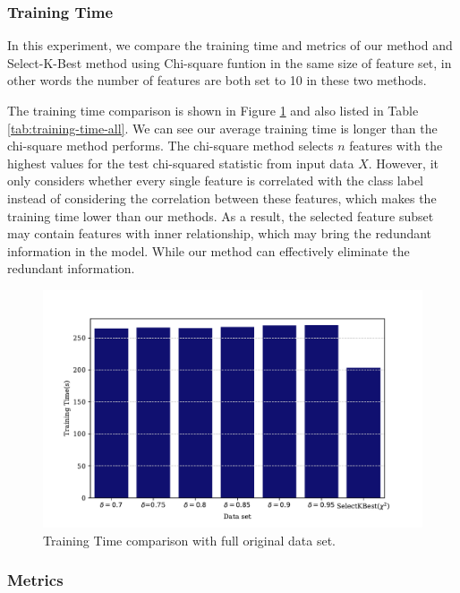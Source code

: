 \documentclass{ieeeaccess}
\theoremstyle{definition}
\begin{document}
\subsubsection{Training Time}

In this experiment, we compare the training time and metrics of our method and Select-K-Best method using Chi-square funtion in the same size of feature set, in other words the number of features are both set to 10 in these two methods.

The training time comparison is shown in Figure \ref{fig:training-time-with-chi2} and also listed in Table \ref{tab:training-time-all}. We can see our average training time is longer than the chi-square method performs. The chi-square method selects $n$ features with the highest values for the test chi-squared statistic from input data $X$. However, it only considers whether every single feature is correlated with the class label instead of considering the correlation between these features, which makes the training time lower than our methods.
As a result, the selected feature subset may contain features with inner relationship, which may bring the redundant information in the model. While our method can effectively eliminate the redundant information.

\begin{figure}[!htpb]
    \centering
    \includegraphics[scale=0.4]{fig/training-time-chi2.pdf}
    \caption{Training Time comparison with full original data set.}
    \label{fig:training-time-with-chi2}
\end{figure}

\subsubsection{Metrics}
\end{document}
